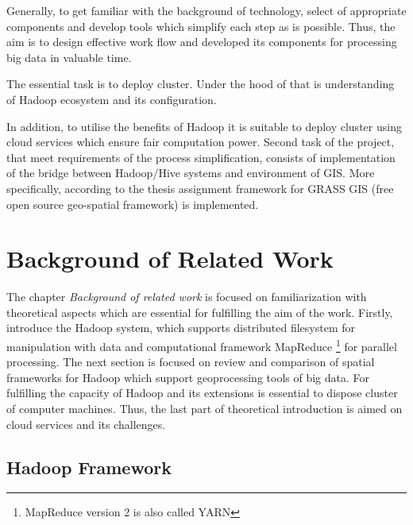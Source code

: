 \documentclass[a4paper,12pt,oneside]{report}
\begin{document}
	Generally, to get familiar with the background of technology,
	select of appropriate components and develop tools which simplify each step as is
	possible. 
	Thus, the aim is to design effective work flow and developed its
	components for processing big data in valuable time.
	
	The essential task is to deploy cluster. Under the hood of that is
	understanding of Hadoop ecosystem and its configuration. 
	
	In addition, to utilise the benefits of Hadoop it is suitable to deploy cluster using cloud
	services which ensure fair computation power. Second task of the project, that meet
	requirements of the process simplification, consists of implementation
	of the bridge between Hadoop/Hive systems and environment of GIS. More specifically,
	according to the thesis assignment framework for GRASS GIS (free open source geo-spatial framework) is implemented. 

	
	
	\newpage
	\chapter*{Background of Related Work}
	The chapter \textit{Background of related work} is focused on familiarization
	with theoretical aspects which are essential for fulfilling the aim of the work.
	Firstly, introduce the Hadoop system, which supports distributed filesystem for
	manipulation with data and computational framework MapReduce \footnote{MapReduce version 2 is also called YARN} for
	parallel processing. 
	The next section is focused on review and comparison of spatial frameworks for
	Hadoop which support geoprocessing tools of big data. For fulfilling the
	capacity of Hadoop and its extensions is essential to dispose cluster of computer
	machines. Thus, the last  part of theoretical introduction is aimed on cloud
	services and its challenges.
	\section{Hadoop Framework}
	\label{sec:hadoop}
\end{document}
